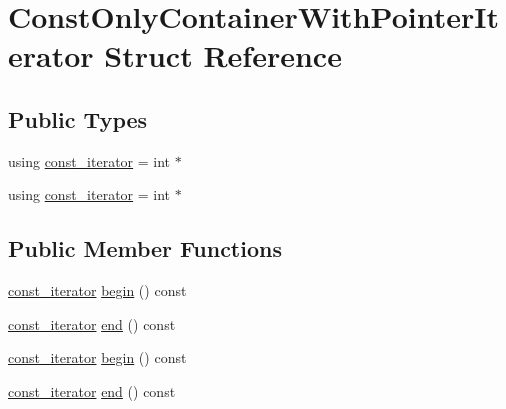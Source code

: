 \hypertarget{struct_const_only_container_with_pointer_iterator}{}\section{Const\+Only\+Container\+With\+Pointer\+Iterator Struct Reference}
\label{struct_const_only_container_with_pointer_iterator}
\subsection*{Public Types}
\begin{DoxyCompactItemize}
\item 
using \mbox{\hyperlink{struct_const_only_container_with_pointer_iterator_a652efbd2c6da61e65cc45123e4182713}{const\+\_\+iterator}} = int $\ast$
\item 
using \mbox{\hyperlink{struct_const_only_container_with_pointer_iterator_a652efbd2c6da61e65cc45123e4182713}{const\+\_\+iterator}} = int $\ast$
\end{DoxyCompactItemize}
\subsection*{Public Member Functions}
\begin{DoxyCompactItemize}
\item 
\mbox{\hyperlink{struct_const_only_container_with_pointer_iterator_a652efbd2c6da61e65cc45123e4182713}{const\+\_\+iterator}} \mbox{\hyperlink{struct_const_only_container_with_pointer_iterator_a3dd48a5028ca3c3bed0a10d7c5fa938b}{begin}} () const
\item 
\mbox{\hyperlink{struct_const_only_container_with_pointer_iterator_a652efbd2c6da61e65cc45123e4182713}{const\+\_\+iterator}} \mbox{\hyperlink{struct_const_only_container_with_pointer_iterator_a041683280e1319a08467fa9035098cff}{end}} () const
\item 
\mbox{\hyperlink{struct_const_only_container_with_pointer_iterator_a652efbd2c6da61e65cc45123e4182713}{const\+\_\+iterator}} \mbox{\hyperlink{struct_const_only_container_with_pointer_iterator_a3dd48a5028ca3c3bed0a10d7c5fa938b}{begin}} () const
\item 
\mbox{\hyperlink{struct_const_only_container_with_pointer_iterator_a652efbd2c6da61e65cc45123e4182713}{const\+\_\+iterator}} \mbox{\hyperlink{struct_const_only_container_with_pointer_iterator_a041683280e1319a08467fa9035098cff}{end}} () const
\end{DoxyCompactItemize}


